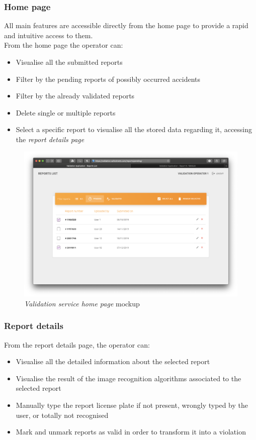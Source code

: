\subsubsection{Home page}
All main features are accessible directly from the home page to provide a rapid and intuitive access to them. \\
From the home page the operator can:
\begin{itemize}
	\item Visualise all the submitted reports
	\item Filter by the pending reports of possibly occurred accidents
	\item Filter by the already validated reports
	\item Delete single or multiple reports
	\item Select a specific report to visualise all the stored data regarding it, accessing the \emph{report details page}\newline\newline
\end{itemize}
 \begin{figure}[ht!]
 	\hspace*{-1cm}
			\centering
			\includegraphics[scale=0.3]{mockups/validationApp1.png}
			\caption{
				\label{fig:cc1} 
				\emph{Validation service home page} mockup
			}
		\end{figure}
		
\clearpage
\subsubsection{Report details}

From the report details page, the operator can:
\begin{itemize}
	\item Visualise all the detailed information about the selected report
	\item Visualise the result of the image recognition algorithms associated to the selected report
	\item Manually type the report license plate if not present, wrongly typed by the user, or totally not recognised
	\item Mark and unmark reports as valid in order to transform it into a violation\newline\newline
\end{itemize}

